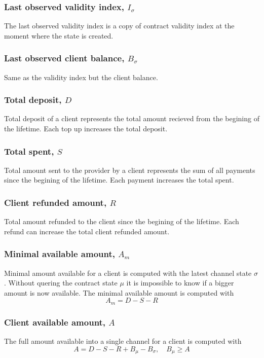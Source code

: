 \documentclass{llncs}
\begin{document}
\subsubsection{Last observed validity index, $I_\sigma$} The last observed validity index is a copy of contract validity index at the moment where the state is created.

\subsubsection{Last observed client balance, $B_\sigma$} Same as the validity index but the client balance.

\subsubsection{Total deposit, $D$} Total deposit of a client represents the total amount recieved from the begining of the lifetime. Each top up increases the total deposit.

\subsubsection{Total spent, $S$} Total amount sent to the provider by a client represents the sum of all payments since the begining of the lifetime. Each payment increases the total spent.

\subsubsection{Client refunded amount, $R$} Total amount refunded to the client since the begining of the lifetime. Each refund can increase the total client refunded amount.

\subsubsection{Minimal available amount, $A_m$} Minimal amount available for a client is computed with the latest channel state $\sigma$. Without quering the contract state $\mu$ it is impossible to know if a bigger amount is now available. The minimal available amount is computed with
$$A_m = D - S - R$$

\subsubsection{Client available amount, $A$} The full amount available into a single channel for a client is computed with
$$A = D - S - R + B_\mu - B_\sigma, \quad B_\mu \geq A$$
\end{document}
